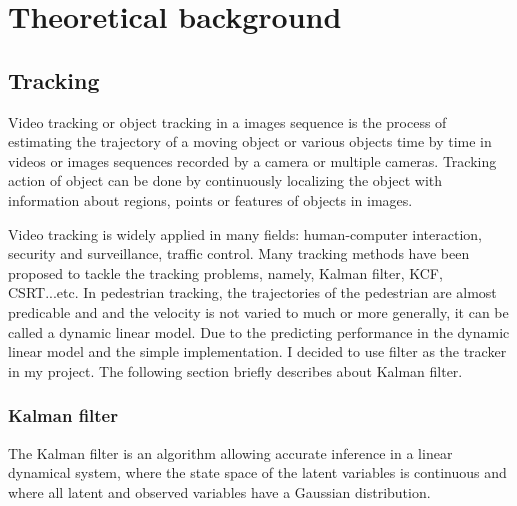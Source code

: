 \chapter{Theoretical background}

\section{Tracking}
\hspace{0.5cm}Video tracking or object tracking in a images sequence is the process of estimating the trajectory of a moving object or various objects time by time in videos or images sequences recorded by a camera or multiple cameras. Tracking action of object can be done by continuously localizing the object with information about regions, points or features of objects in images.\par
Video tracking is widely applied in many fields: human-computer interaction, security and surveillance, traffic control. Many tracking methods have been proposed to tackle the tracking problems, namely, Kalman filter, KCF, CSRT...etc. In pedestrian tracking, the trajectories of the pedestrian are almost predicable and and the velocity is not varied to much or more generally, it can be called a dynamic linear model. Due to the predicting performance in the dynamic linear model and the simple implementation. I decided to use filter as the tracker in my project. The following section briefly describes about Kalman filter.
\pagebreak
\subsection{Kalman filter}
\hspace{0.5cm}The Kalman filter is an algorithm allowing accurate inference in a linear dynamical system, where the state space of the latent variables is continuous and where all latent and observed variables have a Gaussian distribution.\cite{Kalman}

